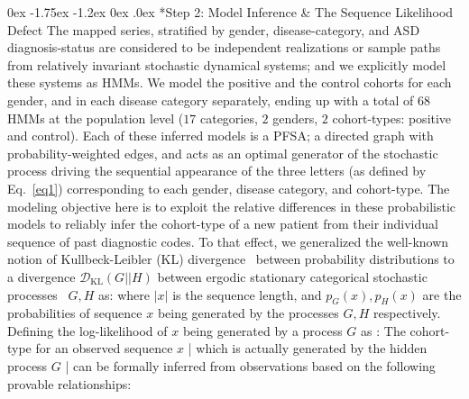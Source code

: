 \documentclass[onecolumn, compsoc,11pt]{IEEEtran}
\makeatletter
\renewcommand\subsection{\@startsection {subsection}{2}{\z@}%
                                   {0ex \@plus -1.75ex \@minus -1.2ex}%
                                   {0ex \@plus.0ex}%
                                   {\fontsize{11}{11}\selectfont\bfseries\sffamily\color{black}}}
\def\treatment{positive\xspace}
\makeatother
\begin{document}
\subsection*{Step 2: Model Inference \& The Sequence Likelihood Defect}
The mapped series, stratified by  gender, disease-category, and ASD diagnosis-status are considered to be independent realizations or sample paths from  relatively invariant stochastic dynamical systems; and we explicitly model these systems as HMMs. We model the \treatment and the control cohorts for each gender, and in  each disease category separately, ending up with a total of $68$ HMMs at the population level ($17$ categories, $2$ genders, $2$ cohort-types: \treatment and control). Each of these inferred models is  a PFSA;  a directed graph with probability-weighted edges, and acts as an optimal generator of the  stochastic process driving the  sequential appearance of the three letters (as defined by Eq.~\eqref{eq1})  corresponding to each gender, disease category, and cohort-type. %
The modeling objective here is to exploit the relative differences in these  probabilistic  models to reliably infer the cohort-type of a new patient from their  individual sequence  of past diagnostic codes.
%
To that effect, we generalized the well-known notion of Kullbeck-Leibler (KL) divergence~\cite{Cover,kullback1951} between probability distributions to a divergence $\mathcal{D}_{\textrm{KL}}(G \vert \vert H)$ between ergodic stationary categorical stochastic processes~\cite{doob1953stochastic} $G,H$ as:
\noindent
where $\vert x\vert $ is the sequence length, and $p_G(x) ,p_H(x) $ are the probabilities of sequence $x$ being generated by the processes $G,H$ respectively.
Defining the  log-likelihood of  $x$ being generated by a process $G$ as :
\noindent
  The cohort-type for an observed sequence $x$ | which is actually generated by the hidden process $G$ | can be formally inferred from observations based on the following provable relationships:
\end{document}
